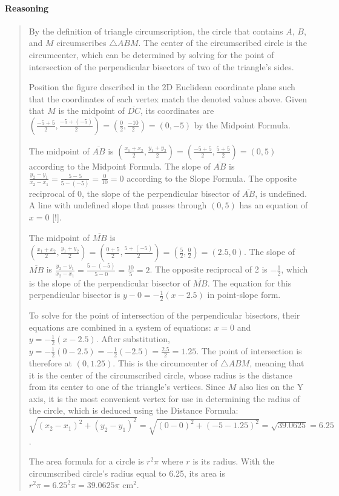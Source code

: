 \documentclass[letterpaper,12pt,twoside]{report}
\begin{document}
	\paragraph{Reasoning}
	\begin{quotation}
		
		By the definition of triangle circumscription, the circle that contains $A$, $B$, and $M$ circumscribes $\triangle ABM$. The center of the circumscribed circle is the circumcenter, which can be determined by solving for the point of intersection of the perpendicular bisectors of two of the triangle's sides.
		
		Position the figure described in the 2D Euclidean coordinate plane such that the coordinates of each vertex match the denoted values above. Given that $M$ is the midpoint of $\overline{DC}$, its coordinates are $(\frac{-5+5}{2},\frac{-5+(-5)}{2})=(\frac{0}{2},\frac{-10}{2})=(0,-5)$ by the Midpoint Formula.
				
		The midpoint of $\overline{AB}$ is $(\frac{x_1+x_2}{2},\frac{y_1+y_2}{2})=(\frac{-5+5}{2},\frac{5+5}{2})=(0,5)$ according to the Midpoint Formula. The slope of $\overline{AB}$ is $\frac{y_2-y_1}{x_2-x_1}=\frac{5-5}{5-(-5)}=\frac{0}{10}=0$ according to the Slope Formula. The opposite reciprocal of 0, the slope of the perpendicular bisector of $\overline{AB}$, is undefined. A line with undefined slope that passes through $(0,5)$ has an equation of $x=0$ [!].
		
		The midpoint of $\overline{MB}$ is $(\frac{x_1+x_2}{2},\frac{y_1+y_2}{2})=(\frac{0+5}{2},\frac{5+(-5)}{2})=(\frac{5}{2},\frac{0}{2})=(2.5,0)$. The slope of $\overline{MB}$ is $\frac{y_2-y_1}{x_2-x_1}=\frac{5-(-5)}{5-0}=\frac{10}{5}=2$. The opposite reciprocal of 2 is $-\frac{1}{2}$, which is the slope of the perpendicular bisector of $\overline{MB}$. The equation for this perpendicular bisector is $y-0=-\frac{1}{2}(x-2.5)$ in point-slope form.
		
		To solve for the point of intersection of the perpendicular bisectors, their equations are combined in a system of equations: $x=0$ and $y=-\frac{1}{2}(x-2.5)$. After substitution, $y=-\frac{1}{2}(0-2.5)=-\frac{1}{2}(-2.5)=\frac{2.5}{2}=1.25$. The point of intersection is therefore at $(0,1.25)$. This is the circumcenter of $\triangle ABM$, meaning that it is the center of the circumscribed circle, whose radius is the distance from its center to one of the triangle's vertices. Since $M$ also lies on the Y axis, it is the most convenient vertex for use in determining the radius of the circle, which is deduced using the Distance Formula: $\sqrt{(x_2-x_1)^2+(y_2-y_1)^2}=\sqrt{(0-0)^2+(-5-1.25)^2}=\sqrt{39.0625}=6.25$.
		
		The area formula for a circle is $r^2 \pi$ where $r$ is its radius. With the circumscribed circle's radius equal to 6.25, its area is $r^2\pi=6.25^2\pi=\boxed{39.0625\pi \text{  cm}^2}$.
		
	\end{quotation}
	
\end{document}
